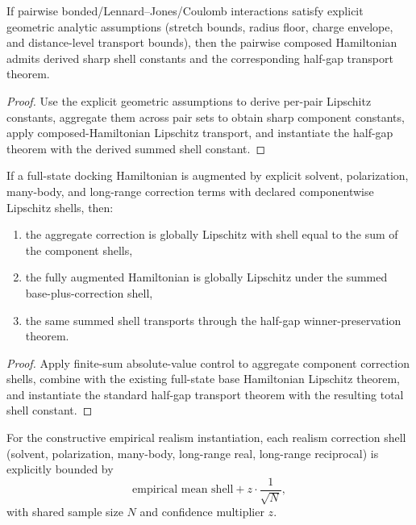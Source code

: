 \begin{theorem}\label{thm:pairwise-geometric-derived-transport}
If pairwise bonded/Lennard--Jones/Coulomb interactions satisfy explicit geometric analytic assumptions (stretch bounds, radius floor, charge envelope, and distance-level transport bounds), then the pairwise composed Hamiltonian admits derived sharp shell constants and the corresponding half-gap transport theorem.
\end{theorem}

\begin{proof}
Use the explicit geometric assumptions to derive per-pair Lipschitz constants, aggregate them across pair sets to obtain sharp component constants, apply composed-Hamiltonian Lipschitz transport, and instantiate the half-gap theorem with the derived summed shell constant.
\end{proof}

\begin{theorem}\label{thm:realism-augmented-forcefield-transport}
If a full-state docking Hamiltonian is augmented by explicit solvent, polarization, many-body, and long-range correction terms with declared componentwise Lipschitz shells, then:
\begin{enumerate}
\item the aggregate correction is globally Lipschitz with shell equal to the sum of the component shells,
\item the fully augmented Hamiltonian is globally Lipschitz under the summed base-plus-correction shell,
\item the same summed shell transports through the half-gap winner-preservation theorem.
\end{enumerate}
\end{theorem}

\begin{proof}
Apply finite-sum absolute-value control to aggregate component correction shells, combine with the existing full-state base Hamiltonian Lipschitz theorem, and instantiate the standard half-gap transport theorem with the resulting total shell constant.
\end{proof}

\begin{theorem}\label{thm:constructive-empirical-realism-shell-envelope}
For the constructive empirical realism instantiation, each realism correction shell (solvent, polarization, many-body, long-range real, long-range reciprocal) is explicitly bounded by
\[
\text{empirical mean shell} + z \cdot \frac{1}{\sqrt{N}},
\]
with shared sample size $N$ and confidence multiplier $z$.
\end{theorem}

